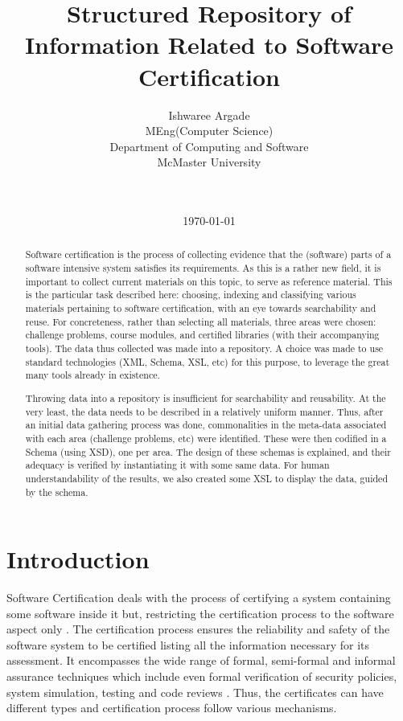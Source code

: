 \documentclass[11pt,letterpaper]{report}
\title{Structured Repository of Information Related to Software Certification}
\author{
        \normalsize
        Ishwaree Argade
            \mbox{}\\ %
        \normalsize MEng(Computer Science)
         \mbox{} \\
       \normalsize Department of Computing and Software 
                \mbox{}\\ %
        \normalsize McMaster University 
        \mbox{} \\
        \date{\today} \\
}
\begin{document}
\maketitle

\begin{abstract}

Software certification is the process of collecting evidence that the (software) parts of a software intensive system satisfies its requirements.  As this is a rather new field, it is important to collect current materials on this topic, to serve as reference material.  This is the particular task described here: choosing, indexing and classifying various materials pertaining to software certification, with an eye towards searchability and reuse.  For concreteness, rather than selecting all materials, three areas were chosen: challenge problems, course modules, and certified libraries (with their accompanying tools).  The data thus collected was made into a repository.  A choice was made to use standard technologies (XML, Schema, XSL, etc) for this purpose, to leverage the great many tools already in existence.

Throwing data into a repository is insufficient for searchability and reusability.  At the very least, the data needs to be described in a relatively uniform manner.  Thus, after an initial data gathering process was done, commonalities in the meta-data associated with each area (challenge problems, etc) were identified.  These were then codified in a Schema (using XSD), one per area.  The design of these schemas is explained, and their adequacy is verified by instantiating it with some same data.  For human understandability of the results, we also created some XSL to display the data, guided by the schema.  
\end{abstract}

\setcounter{tocdepth}{2}
\tableofcontents

\chapter{Introduction}

Software Certification deals with the process of certifying a system containing some software inside it but, restricting the certification process to the software aspect only \cite{seminar}. The certification process ensures the reliability and safety of the software system to be certified listing all the information necessary for its assessment. It encompasses the wide range of formal, semi-formal and informal assurance techniques which include even formal verification of security policies, system simulation, testing and code reviews \cite{SCMS}. Thus, the certificates can have different types and certification process follow various mechanisms.
\end{document}
